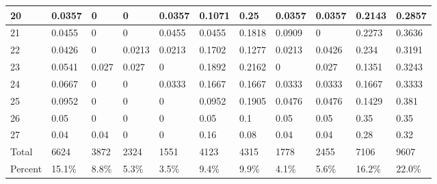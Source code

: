 \documentclass[12pt]{article}
\begin{document}
\begin{table}
{\begin{tabular}{ | l | l | l | l | l | l | l | l | l | l | l |  }
20&0.0357&0&0&0.0357&0.1071&0.25&0.0357&0.0357&0.2143&0.2857 \\ \hline
21&0.0455&0&0&0.0455&0.0455&0.1818&0.0909&0&0.2273&0.3636 \\ \hline
22&0.0426&0&0.0213&0.0213&0.1702&0.1277&0.0213&0.0426&0.234&0.3191 \\ \hline
23&0.0541&0.027&0.027&0&0.1892&0.2162&0&0.027&0.1351&0.3243 \\ \hline
24&0.0667&0&0&0.0333&0.1667&0.1667&0.0333&0.0333&0.1667&0.3333 \\ \hline
25&0.0952&0&0&0&0.0952&0.1905&0.0476&0.0476&0.1429&0.381 \\ \hline
26&0.05&0&0&0&0.05&0.1&0.05&0.05&0.35&0.35 \\ \hline
27&0.04&0.04&0&0&0.16&0.08&0.04&0.04&0.28&0.32 \\ \hline
Total&6624&3872&2324&1551&4123&4315&1778&2455&7106&9607 \\ \hline
Percent&15.1\%&8.8\%&5.3\%&3.5\%&9.4\%&9.9\%&4.1\%&5.6\%&16.2\%&22.0\% \\ \hline
\end{tabular}
}
\end{table}
\end{document}
